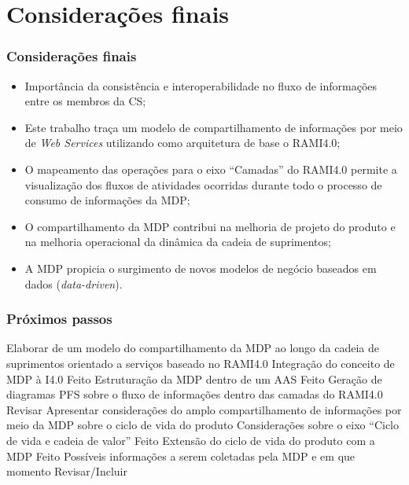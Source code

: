 \documentclass[10pt]{beamer}
\begin{document}
\section{Considerações finais}

\begin{frame}
	\frametitle{Considerações finais}
	
	{\small
	\begin{itemize}
		\item Importância da consistência e interoperabilidade no fluxo de informações entre os membros da CS;
		
		\item Este trabalho traça um modelo de compartilhamento de informações por meio de \textit{Web Services} utilizando como arquitetura de base o RAMI4.0;
		
		\item O mapeamento das operações para o eixo ``Camadas'' do RAMI4.0 permite a visualização dos fluxos de atividades ocorridas durante todo o processo de consumo de informações da MDP;
		
		\item O compartilhamento da MDP contribui na melhoria de projeto do produto e na melhoria operacional da dinâmica da cadeia de suprimentos;
		
		\item A MDP propicia o surgimento de novos modelos de negócio baseados em dados (\textit{data-driven}).
	\end{itemize}
	}
	
\end{frame}
\begin{frame}
	\frametitle{Próximos passos}
	
	
	\begin{outline}[enumerate]
		\1 Elaborar de um modelo do compartilhamento da MDP ao longo da cadeia de suprimentos orientado a serviços baseado no RAMI4.0
			\2 Integração do conceito de MDP à I4.0 \textcolor{tealgreen}{Feito}
			\2 Estruturação da MDP dentro de um AAS \textcolor{tealgreen}{Feito}
			\2 Geração de diagramas PFS sobre o fluxo de informações dentro das camadas do RAMI4.0 \textcolor{terracotta}{Revisar}
		\1 Apresentar considerações do amplo compartilhamento de informações por meio da MDP sobre o ciclo de vida do produto
			\2 Considerações sobre o eixo ``Ciclo de vida e cadeia de valor'' \textcolor{tealgreen}{Feito}
			\2 Extensão do ciclo de vida do produto com a MDP \textcolor{tealgreen}{Feito}
			\2 Possíveis informações a serem coletadas pela MDP e em que momento  \textcolor{terracotta}{Revisar/Incluir}
	\end{outline}
	
\end{frame}
\end{document}
